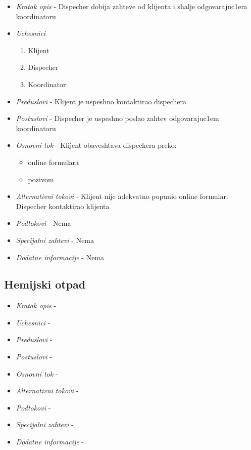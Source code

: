 \documentclass[10 pt]{article}
\begin{document}
\begin{itemize}
	\item \textit{Kratak opis} - Dispecher dobija zahteve od klijenta i shalje odgovarajuc1em koordinatoru
	\item \textit{Uchesnici} \\
		\begin{enumerate}
			\item Klijent
			\item Dispecher
			\item Koordinator
		\end{enumerate}
	\item \textit{Preduslovi} - Klijent je uspeshno kontaktirao dispechera
	\item \textit{Postuslovi} - Dispecher je uspeshno poslao zahtev odgovarajuc1em koordinatoru
	\item \textit{Osnovni tok} - Klijent obaveshtava dispechera preko:\\
		\begin{itemize}
			\item online formulara
			\item pozivom
		\end{itemize}
	\item \textit{Alternativni tokovi} - Klijent nije adekvatno popunio online formular. Dispecher kontaktirao klijenta
	\item \textit{Podtokovi} - Nema
	\item \textit{Specijalni zahtevi} - Nema
	\item \textit{Dodatne informacije} - Nema
\end{itemize}

\subsection{Hemijski otpad}
\begin{itemize}
	\item \textit{Kratak opis} - 
	\item \textit{Uchesnici} -
	\item \textit{Preduslovi} -
	\item \textit{Postuslovi} - 
	\item \textit{Osnovni tok} - 
	\item \textit{Alternativni tokovi} - 
	\item \textit{Podtokovi} - 
	\item \textit{Specijalni zahtevi} - 
	\item \textit{Dodatne informacije} - 
\end{itemize}
\end{document}
